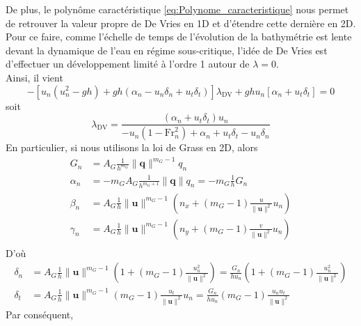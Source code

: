\documentclass[11pt, a4paper, oneside]{report}
\begin{document}
\begin{appendices}
De plus, le polynôme caractéristique \eqref{eq:Polynome_caracteristique} nous permet de retrouver la valeur propre de De Vries en 1D et d'étendre cette dernière en 2D. \\
Pour ce faire, comme l'échelle de temps de l'évolution de la bathymétrie est lente devant la dynamique de l'eau en régime sous-critique, l'idée de De Vries \cite{vries1965considerations} est d'effectuer un développement limité à l'ordre 1 autour de $\lambda = 0$. \\
Ainsi, il vient
\begin{equation}
    - \left[ u_n(u_n^2 - gh) + gh \left( \alpha_n - u_n \delta_n + u_t \delta_t \right) \right] \lambda_\text{DV} + gh u_n \left[ \alpha_n + u_t \delta_t \right] = 0
\end{equation}
soit
\begin{equation}
    \lambda_\text{DV} = \frac{\left( \alpha_n + u_t \delta_t \right) u_n}{-u_n \left( 1 - \text{Fr}_n^2 \right) + \alpha_n + u_t \delta_t - u_n \delta_n}
\end{equation}
En particulier, si nous utilisons la loi de Grass en 2D, alors
\begin{equation}
    \begin{aligned}
        G_n & = A_G \frac{1}{h^{m_G}} \| \bm{q} \|^{m_G - 1} q_n \\
        \alpha_n & = -m_G A_G \frac{1}{h^{m_G + 1}} \| \bm{q} \| q_n = - m_G \frac{1}{h} G_n \\
        \beta_n & = A_G \frac{1}{h} \| \bm{u} \|^{m_G - 1} \left( n_x + (m_G - 1) \frac{u}{\| \bm{u} \|^2} u_n \right) \\
        \gamma_n & = A_G \frac{1}{h} \| \bm{u} \|^{m_G - 1} \left( n_y + (m_G - 1) \frac{v}{\| \bm{u} \|^2} u_n \right) \\
    \end{aligned}
\end{equation}
D'où
\begin{equation}
    \begin{aligned}
        \delta_n & = A_G \frac{1}{h} \| \bm{u} \|^{m_G - 1} \left( 1 + (m_G - 1) \frac{u_n^2}{\| \bm{u} \|^2} \right) = \frac{G_n}{h u_n} \left( 1 + (m_G - 1) \frac{u_n^2}{\| \bm{u} \|^2} \right) \\
        \delta_t & = A_G \frac{1}{h} \| \bm{u} \|^{m_G - 1} (m_G - 1) \frac{u_t}{\| \bm{u} \|^2} u_n = \frac{G_n}{h u_n} (m_G - 1) \frac{u_n u_t}{\| \bm{u} \|^2}
    \end{aligned}
\end{equation}
Par conséquent,
\begin{equation}

\end{equation}
\end{appendices}
\end{document}

